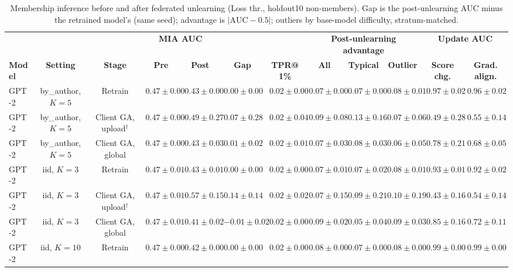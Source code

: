 \begin{table}[t]
\centering
\caption{Membership inference before and after federated unlearning (Loss thr., holdout10 non-members). Gap is the post-unlearning AUC minus the retrained model's (same seed); advantage is $|\mathrm{AUC}-0.5|$; outliers by base-model difficulty, stratum-matched.}
\label{tab:federated-loss-threshold-holdout10}
\footnotesize
\renewcommand{\arraystretch}{1.2}
\setlength{\tabcolsep}{2pt}
\begin{tabular*}{\textwidth}{@{\extracolsep{\fill}}lccccccccccc@{}}
\toprule
 & & & \multicolumn{2}{c}{\textbf{MIA AUC}} & & & \multicolumn{3}{c}{\textbf{Post-unlearning advantage}} & \multicolumn{2}{c}{\textbf{Update AUC}} \\
\cmidrule(lr){4-5}\cmidrule(lr){8-10}\cmidrule(lr){11-12}
\textbf{Model} & \textbf{Setting} & \textbf{Stage} & \textbf{Pre} & \textbf{Post} & \textbf{Gap} & \textbf{TPR@1\%} & \textbf{All} & \textbf{Typical} & \textbf{Outlier} & \textbf{Score chg.} & \textbf{Grad. align.} \\
\midrule
GPT-2 & by\_author, $K=5$ & Retrain & $0.47 \pm 0.00$ & $0.43 \pm 0.00$ & $0.00 \pm 0.00$ & $0.02 \pm 0.00$ & $0.07 \pm 0.00$ & $0.07 \pm 0.00$ & $0.08 \pm 0.01$ & $0.97 \pm 0.02$ & $0.96 \pm 0.02$ \\
GPT-2 & by\_author, $K=5$ & Client GA, upload$^{\dagger}$ & $0.47 \pm 0.00$ & $0.49 \pm 0.27$ & $0.07 \pm 0.28$ & $0.02 \pm 0.04$ & $0.09 \pm 0.08$ & $0.13 \pm 0.16$ & $0.07 \pm 0.06$ & $0.49 \pm 0.28$ & $0.55 \pm 0.14$ \\
GPT-2 & by\_author, $K=5$ & Client GA, global & $0.47 \pm 0.00$ & $0.43 \pm 0.03$ & $0.01 \pm 0.02$ & $0.02 \pm 0.01$ & $0.07 \pm 0.03$ & $0.08 \pm 0.03$ & $0.06 \pm 0.05$ & $0.78 \pm 0.21$ & $0.68 \pm 0.05$ \\
GPT-2 & iid, $K=3$ & Retrain & $0.47 \pm 0.01$ & $0.43 \pm 0.01$ & $0.00 \pm 0.00$ & $0.02 \pm 0.00$ & $0.07 \pm 0.01$ & $0.07 \pm 0.02$ & $0.08 \pm 0.01$ & $0.93 \pm 0.01$ & $0.92 \pm 0.02$ \\
GPT-2 & iid, $K=3$ & Client GA, upload$^{\dagger}$ & $0.47 \pm 0.01$ & $0.57 \pm 0.15$ & $0.14 \pm 0.14$ & $0.02 \pm 0.02$ & $0.07 \pm 0.15$ & $0.09 \pm 0.21$ & $0.10 \pm 0.19$ & $0.43 \pm 0.16$ & $0.54 \pm 0.14$ \\
GPT-2 & iid, $K=3$ & Client GA, global & $0.47 \pm 0.01$ & $0.41 \pm 0.02$ & $-0.01 \pm 0.02$ & $0.02 \pm 0.00$ & $0.09 \pm 0.02$ & $0.05 \pm 0.04$ & $0.09 \pm 0.03$ & $0.85 \pm 0.16$ & $0.72 \pm 0.11$ \\
GPT-2 & iid, $K=10$ & Retrain & $0.47 \pm 0.00$ & $0.42 \pm 0.00$ & $0.00 \pm 0.00$ & $0.02 \pm 0.00$ & $0.08 \pm 0.00$ & $0.07 \pm 0.00$ & $0.08 \pm 0.00$ & $0.99 \pm 0.00$ & $0.99 \pm 0.00$ \\

\end{tabular*}
\end{table}
